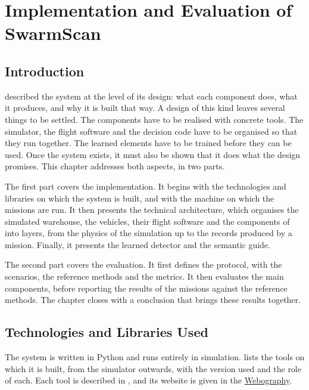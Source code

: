 \chapter[Implementation and Evaluation]{Implementation and Evaluation of
    SwarmScan}%
\label{chap:implementation}

\section{Introduction}%
\label{sec:impl:intro}

 described the system at the level of its design: what each
component does, what it produces, and why it is built that way. A design of this
kind leaves several things to be settled. The components have to be realised
with concrete tools. The simulator, the flight software and the decision code
have to be organised so that they run together. The learned elements have to be
trained before they can be used. Once the system exists, it must also be shown
that it does what the design promises. This chapter addresses both aspects, in
two parts.

The first part covers the implementation. It begins with the technologies and
libraries on which the system is built, and with the machine on which the
missions are run. It then presents the technical architecture, which organises
the simulated warehouse, the vehicles, their flight software and the components
of  into layers, from the physics of the simulation up to the
records produced by a mission. Finally, it presents the learned detector and the
semantic guide.

The second part covers the evaluation. It first defines the protocol, with the
scenarios, the reference methods and the metrics. It then evaluates the main
components, before reporting the results of the missions against the reference
methods. The chapter closes with a conclusion that brings these results together.

\section{Technologies and Libraries Used}%
\label{sec:impl:stack}

The system is written in Python and runs entirely in simulation.
 lists the tools on which it is built, from the simulator
outwards, with the version used and the role of each. Each tool is described in
, and its website is given in the
\hyperref[chap:webography]{Webography}.

